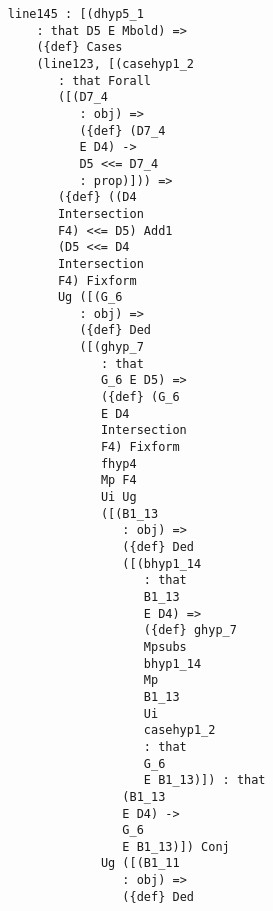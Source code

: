 \documentclass[12pt]{article}
\begin{document}
\begin{verbatim}
                        line145 : [(dhyp5_1 
                            : that D5 E Mbold) => 
                            ({def} Cases 
                            (line123, [(casehyp1_2 
                               : that Forall 
                               ([(D7_4 
                                  : obj) => 
                                  ({def} (D7_4 
                                  E D4) -> 
                                  D5 <<= D7_4 
                                  : prop)])) => 
                               ({def} ((D4 
                               Intersection 
                               F4) <<= D5) Add1 
                               (D5 <<= D4 
                               Intersection 
                               F4) Fixform 
                               Ug ([(G_6 
                                  : obj) => 
                                  ({def} Ded 
                                  ([(ghyp_7 
                                     : that 
                                     G_6 E D5) => 
                                     ({def} (G_6 
                                     E D4 
                                     Intersection 
                                     F4) Fixform 
                                     fhyp4 
                                     Mp F4 
                                     Ui Ug 
                                     ([(B1_13 
                                        : obj) => 
                                        ({def} Ded 
                                        ([(bhyp1_14 
                                           : that 
                                           B1_13 
                                           E D4) => 
                                           ({def} ghyp_7 
                                           Mpsubs 
                                           bhyp1_14 
                                           Mp 
                                           B1_13 
                                           Ui 
                                           casehyp1_2 
                                           : that 
                                           G_6 
                                           E B1_13)]) : that 
                                        (B1_13 
                                        E D4) -> 
                                        G_6 
                                        E B1_13)]) Conj 
                                     Ug ([(B1_11 
                                        : obj) => 
                                        ({def} Ded 

\end{verbatim}
\end{document}
